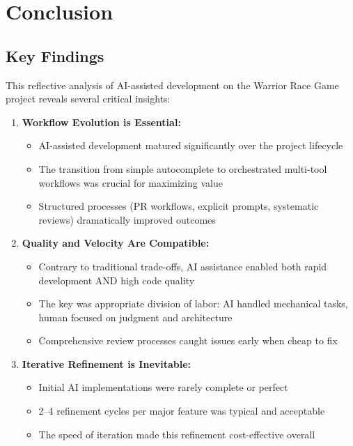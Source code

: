 \documentclass[12pt,a4paper]{article}
\begin{document}
\newpage

\section{Conclusion}

\subsection{Key Findings}

This reflective analysis of AI-assisted development on the Warrior Race Game project reveals several critical insights:

\begin{enumerate}
    \item \textbf{Workflow Evolution is Essential:}
    \begin{itemize}
        \item AI-assisted development matured significantly over the project lifecycle
        \item The transition from simple autocomplete to orchestrated multi-tool workflows was crucial for maximizing value
        \item Structured processes (PR workflows, explicit prompts, systematic reviews) dramatically improved outcomes
    \end{itemize}
    
    \item \textbf{Quality and Velocity Are Compatible:}
    \begin{itemize}
        \item Contrary to traditional trade-offs, AI assistance enabled both rapid development AND high code quality
        \item The key was appropriate division of labor: AI handled mechanical tasks, human focused on judgment and architecture
        \item Comprehensive review processes caught issues early when cheap to fix
    \end{itemize}
    
    \item \textbf{Iterative Refinement is Inevitable:}
    \begin{itemize}
        \item Initial AI implementations were rarely complete or perfect
        \item 2--4 refinement cycles per major feature was typical and acceptable
        \item The speed of iteration made this refinement cost-effective overall
    \end{itemize}
    

\end{enumerate}
\end{document}
